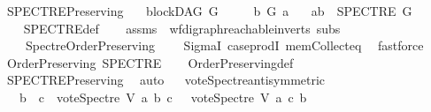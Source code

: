 \begin{isabellebody}
\isanewline
%
\endisadelimproof
\isanewline
\isanewline
{}\isamarkupfalse%
\ SPECTRE{\isacharunderscore}{\kern0pt}Preserving{\isacharcolon}{\kern0pt}\isanewline
\ \ \ {\isachardoublequoteopen}blockDAG\ G{\isachardoublequoteclose}\isanewline
\ \ \ \ \ {\isachardoublequoteopen}b\ {\isasymrightarrow}\isactrlsup {\isacharplus}{\kern0pt}\isactrlbsub G\isactrlesub \ a{\isachardoublequoteclose}\isanewline
\ \ \ {\isachardoublequoteopen}{\isacharparenleft}{\kern0pt}a{\isacharcomma}{\kern0pt}b{\isacharparenright}{\kern0pt}\ {\isasymin}\ {\isacharparenleft}{\kern0pt}SPECTRE\ G{\isacharparenright}{\kern0pt}{\isachardoublequoteclose}\ \ \ \isanewline
%
\isadelimproof
\ \ %
\endisadelimproof
%
\isatagproof
{}\isamarkupfalse%
\ SPECTRE{\isacharunderscore}{\kern0pt}def\isanewline
\ \ \isamarkupfalse%
\ assms\ \ wf{\isacharunderscore}{\kern0pt}digraph{\isachardot}{\kern0pt}reachable{}{\isacharunderscore}{\kern0pt}in{\isacharunderscore}{\kern0pt}verts\ subs\isanewline
\ \ \ \ Spectre{\isacharunderscore}{\kern0pt}Order{\isacharunderscore}{\kern0pt}Preserving\isanewline
\ \ \ \ SigmaI\ case{\isacharunderscore}{\kern0pt}prodI\ mem{\isacharunderscore}{\kern0pt}Collect{\isacharunderscore}{\kern0pt}eq\ \isamarkupfalse%
\ fastforce%
\endisatagproof
{\isafoldproof}%
%
\isadelimproof
\ \isanewline
%
\endisadelimproof
\isanewline
{}\isamarkupfalse%
\ {\isachardoublequoteopen}Order{\isacharunderscore}{\kern0pt}Preserving\ SPECTRE{\isachardoublequoteclose}\isanewline
%
\isadelimproof
\ \ %
\endisadelimproof
%
\isatagproof
{}\isamarkupfalse%
\ Order{\isacharunderscore}{\kern0pt}Preserving{\isacharunderscore}{\kern0pt}def\ \isanewline
\ \ \isamarkupfalse%
\ SPECTRE{\isacharunderscore}{\kern0pt}Preserving\ \isamarkupfalse%
\ auto%
\endisatagproof
{\isafoldproof}%
%
\isadelimproof
\ \isanewline
%
\endisadelimproof
\isanewline
{}\isamarkupfalse%
\ vote{\isacharunderscore}{\kern0pt}Spectre{\isacharunderscore}{\kern0pt}antisymmetric{\isacharcolon}{\kern0pt}\ \isanewline
\ \ \ {\isachardoublequoteopen}b\ {\isasymnoteq}\ c\ {\isasymLongrightarrow}\ vote{\isacharunderscore}{\kern0pt}Spectre\ V\ a\ b\ c\ {\isacharequal}{\kern0pt}\ {\isacharminus}{\kern0pt}\ {\isacharparenleft}{\kern0pt}vote{\isacharunderscore}{\kern0pt}Spectre\ V\ a\ c\ b{\isacharparenright}{\kern0pt}{\isachardoublequoteclose}\isanewline
%
\isadelimproof
%
\endisadelimproof
%
\isatagproof
{}\isamarkupfalse%

\end{isabellebody}
